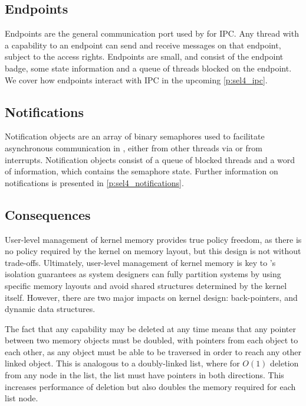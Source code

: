 \subsection{Endpoints}
\label{s:endpoints}

Endpoints are the general communication port used by \selfour for \gls{IPC}.
Any thread with a
capability to an endpoint can send and receive messages on that endpoint, subject to the access
rights. Endpoints are small, and consist of the endpoint badge, some state information and a queue
of threads blocked on the endpoint. We cover how endpoints interact with IPC in the upcoming
\cref{p:sel4_ipc}. 

\subsection{Notifications}

Notification objects are an array of binary semaphores used to facilitate asynchronous communication in \selfour, either from other threads via \send or from
interrupts. Notification objects consist of a queue of blocked threads and a word of information,
which contains the semaphore state. Further information on notifications is presented in
\cref{p:sel4_notifications}. 

\subsection{Consequences}

User-level management of kernel memory provides true policy freedom, as there is no
policy required by the kernel on memory layout, but this design is not without trade-offs. Ultimately,
user-level management of kernel memory is key to \selfour's isolation
guarantees as system designers can fully partition systems by using specific memory layouts and
avoid shared structures determined by the kernel itself. However, there are two major impacts on kernel 
design: back-pointers, and dynamic data structures. 

The fact that any capability may be deleted at any time means that any pointer between two memory
objects must be doubled, with pointers from each object to each other, as any object must be able to be
traversed in order to reach any other linked object. This is analogous to a doubly-linked list,
where for $O(1)$ deletion from any node in the list, the list must have pointers in both directions.
This increases performance of deletion but also doubles the memory required for each list node. 

